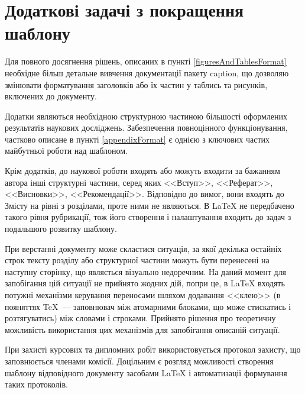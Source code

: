 \section{Додаткові задачі з покращення шаблону}
\label{templateUpgrade}
Для повного досягнення рішень, описаних в пункті \ref{figuresAndTablesFormat} необхідне більш детальне вивчення документації пакету caption, що дозволяю змінювати форматування заголовків або їх частин у таблись та рисунків, включених до документу.

Додатки являються необхідною структурною частиною більшості оформлених результатів наукових досліджень. Забезпечення повноцінного функціонування, частково описане в пункті \ref{appendixFormat} є однією з ключових частих майбутньої роботи над шаблоном.

Крім додатків, до наукової роботи входять або можуть входити за бажанням автора інші структурні частини, серед яких <<Вступ>>, <<Реферат>>, <<Висновки>>, <<Рекомендації>>. Відповідно до вимог, вони входять до Змісту на рівні з розділами, проте ними не являються. В \LaTeX{} не передбачено такого рівня рубрикації, тож його створення і налаштування входить до задач з подальшого розвитку шаблону.

При верстанні документу може скластися ситуація, за якої декілька остайніх строк тексту розділу або структурної частини можуть бути перенесені на наступну сторінку, що являється візуально недоречним. На даний момент для запобігання цій ситуації не прийнято жодних дій, попри це, в \LaTeX{} входять потужні механізми керування переносами шляхом додавання <<клею>> (в пояняттях \TeX{}~--- заповнювач між атомарними блоками, що може стискатись і розтягуватись) між словами і строками. Прийнято рішення про теоретичну можливість використання цих механізмів для запобігання описаній ситуації.

При захисті курсових та дипломних робіт використовується протокол захисту, що заповнюється членами комісії. Доцільним є розгляд можливості створення шаблону відповідного документу засобами \LaTeX{} і автоматизації формування таких протоколів.